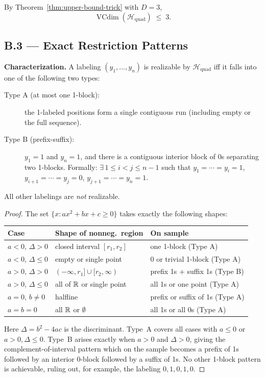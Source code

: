 \documentclass{article}
\begin{document}
By Theorem~\ref{thm:upper-bound-trick} with $D=3$,
\[
  \operatorname{VCdim}(\mathcal{H}_{\mathrm{quad}})\;\le\;3.
\]
 
\subsection{B.3 --- Exact Restriction Patterns}
 
\begin{summarybox}
\textbf{Characterization.}
A labeling $(y_1,\dots,y_n)$ is realizable by $\mathcal{H}_{\mathrm{quad}}$
iff it falls into one of the following two types:
\begin{description}
  \item[Type A (at most one 1-block):] the 1-labeled positions form a
    single contiguous run (including empty or the full sequence).
  \item[Type B (prefix-suffix):] $y_1=1$ and $y_n=1$, and there is a
    contiguous interior block of 0s separating two 1-blocks.
    Formally: $\exists\,1\le i<j\le n-1$ such that
    $y_1=\cdots=y_i=1$, $y_{i+1}=\cdots=y_j=0$, $y_{j+1}=\cdots=y_n=1$.
\end{description}
All other labelings are \emph{not} realizable.
\end{summarybox}
 
\begin{proof}
The set $\{x:ax^2+bx+c\ge0\}$ takes exactly the following shapes:
 
\medskip
\begin{center}
\begin{tabular}{lll}
\toprule
Case & Shape of nonneg.\ region & On sample \\
\midrule
$a<0$, $\Delta>0$ & closed interval $[r_1,r_2]$ & one 1-block (Type A) \\
$a<0$, $\Delta\le0$ & empty or single point & 0 or trivial 1-block (Type A) \\
$a>0$, $\Delta>0$ & $(-\infty,r_1]\cup[r_2,\infty)$ & prefix 1s + suffix 1s (Type B) \\
$a>0$, $\Delta\le0$ & all of $\mathbb{R}$ or single point & all 1s or one point (Type A) \\
$a=0$, $b\ne0$ & halfline & prefix or suffix of 1s (Type A) \\
$a=b=0$ & all $\mathbb{R}$ or $\emptyset$ & all 1s or all 0s (Type A) \\
\bottomrule
\end{tabular}
\end{center}
\medskip
 
Here $\Delta=b^2-4ac$ is the discriminant.
Type~A covers all cases with $a\le0$ or $a>0,\Delta\le0$.
Type~B arises exactly when $a>0$ and $\Delta>0$, giving the
complement-of-interval pattern which on the sample becomes a prefix of 1s
followed by an interior 0-block followed by a suffix of 1s.
No other 1-block pattern is achievable, ruling out, for example,
the labeling $0,1,0,1,0$.
\end{proof}
 
\end{document}
